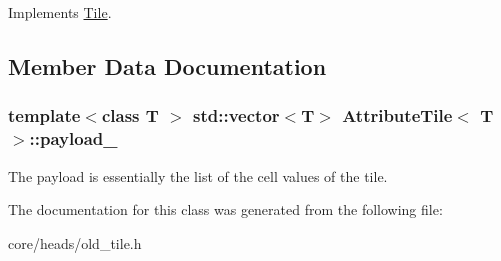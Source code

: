 Implements \hyperlink{classTile_ad5d6fccae173c455bb3f74ac5fd87791}{Tile}.



\subsection{Member Data Documentation}
\hypertarget{classAttributeTile_a1fc1096adebca025565e774a89937736}{}
\subsubsection[{payload\+\_\+}]{\setlength{\rightskip}{0pt plus 5cm}template$<$class T $>$ std\+::vector$<$T$>$ {\bf Attribute\+Tile}$<$ T $>$\+::payload\+\_\+\hspace{0.3cm}{\ttfamily [private]}}\label{classAttributeTile_a1fc1096adebca025565e774a89937736}
The payload is essentially the list of the cell values of the tile. 

The documentation for this class was generated from the following file\+:\begin{DoxyCompactItemize}
\item 
core/heads/old\+\_\+tile.\+h\end{DoxyCompactItemize}
